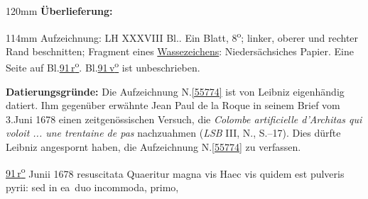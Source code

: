 %
\frenchspacing%
\begin{ledgroupsized}[r]{120mm}%
\footnotesize%
\pstart%
\noindent%
\textbf{Überlieferung:}%
\pend%
\end{ledgroupsized}%
\begin{ledgroupsized}[r]{114mm}%
\footnotesize%
\pstart%
\parindent -6mm%
%
Aufzeichnung:
LH XXXVIII Bl..
Ein Blatt, 8\textsuperscript{o};
linker, oberer und rechter Rand beschnitten;
Fragment eines \href{\Scan{LH_38_091wz}}{Wassezeichens}:
Niedersächsiches Papier.
Eine Seite auf Bl.\;\href{\Scan{LH_38_091r}}{91\,r\textsuperscript{o}}.
Bl.\;\href{\Scan{LH_38_091v}}{91\,v\textsuperscript{o}} ist unbeschrieben.
\pend%
\end{ledgroupsized}%
\vspace*{5mm}%
\begin{ledgroup}%
\footnotesize%
\pstart%
\noindent%
\textbf{Datierungsgründe:}
Die Aufzeichnung N.\;\ref{55774} ist von Leibniz eigenhändig datiert.
Ihm gegenüber erwähnte Jean Paul de la Roque%
in seinem Brief vom 3.\;Juni 1678 einen zeitgenössischen Versuch,
die \textit{Colombe artificielle d'Architas qui voloit ... une trentaine de pas}
nachzuahmen (\textit{LSB} III, N., S.--17).\cite{01477}
Dies dürfte Leibniz angespornt haben, die Aufzeichnung N.\;\ref{55774} zu verfassen.
\pend%
\end{ledgroup}%
%
\frenchspacing%
\vspace{8mm}%
\normalsize%
\pstart%
\noindent%
\lbrack%
\href{\Scan{LH_38_091r}}%
{91\,r\textsuperscript{o}}%
\rbrack%
\phantom{Junii 1678}%
\hfill%
%
Junii 1678
\pend%
\pstart%
\noindent%
\centering%
resuscitata%
%
\pend%
\vspace{0.5em}%
\pstart%
\noindent%
Quaeritur magna vis%
%
Haec vis quidem est pulveris pyrii:%
%
sed in ea~duo incommoda,%
primo,
